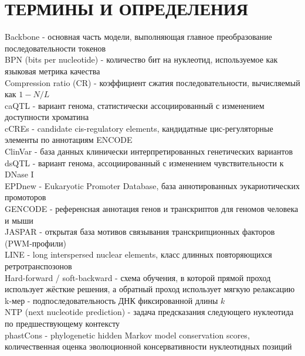 \chapter*{ТЕРМИНЫ И ОПРЕДЕЛЕНИЯ}
\setlength{\parindent}{0pt}
Backbone - основная часть модели, выполняющая главное преобразование
последовательности токенов\\[0.5em]
BPN (bits per nucleotide) - количество бит на нуклеотид, используемое
как языковая метрика качества\\[0.5em]
Compression ratio (CR) - коэффициент сжатия последовательности,
вычисляемый как $1-N/L$\\[0.5em]
caQTL - вариант генома, статистически ассоциированный с изменением
доступности хроматина\\[0.5em]
cCREs - candidate cis-regulatory elements, кандидатные
цис-регуляторные элементы по аннотациям ENCODE\\[0.5em]
ClinVar - база данных клинически интерпретированных генетических
вариантов\\[0.5em]
dsQTL - вариант генома, ассоциированный с изменением чувствительности
к DNase I\\[0.5em]
EPDnew - Eukaryotic Promoter Database, база аннотированных
эукариотических промоторов\\[0.5em]
GENCODE - референсная аннотация генов и транскриптов для геномов
человека и мыши\\[0.5em]
JASPAR - открытая база мотивов связывания транскрипционных факторов
(PWM-профили)\\[0.5em]
LINE - long interspersed nuclear elements, класс длинных
повторяющихся ретротранспозонов\\[0.5em]
Hard-forward / soft-backward - схема обучения, в которой прямой
проход использует жёсткие решения, а обратный проход использует
мягкую релаксацию\\[0.5em]
k-мер - подпоследовательность ДНК фиксированной длины $k$\\[0.5em]
NTP (next nucleotide prediction) - задача предсказания следующего
нуклеотида по предшествующему контексту\\[0.5em]
phastCons - phylogenetic hidden Markov model conservation scores,
количественная оценка эволюционной консервативности нуклеотидных
позиций\\[0.5em]
